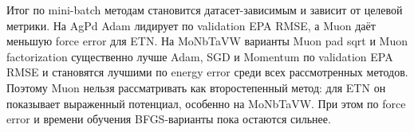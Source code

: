 Итог по mini-batch методам становится датасет-зависимым и зависит от целевой метрики. На AgPd Adam лидирует по validation EPA RMSE, а Muon даёт меньшую force error для ETN. На MoNbTaVW варианты Muon pad sqrt и Muon factorization существенно лучше Adam, SGD и Momentum по validation EPA RMSE и становятся лучшими по energy error среди всех рассмотренных методов. Поэтому Muon нельзя рассматривать как второстепенный метод: для ETN он показывает выраженный потенциал, особенно на MoNbTaVW. При этом по force error и времени обучения BFGS-варианты пока остаются сильнее.
